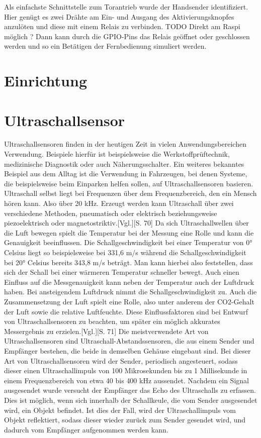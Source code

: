 Als einfachste Schnittstelle zum Torantrieb wurde der Handsender identifiziert. Hier genügt es zwei Drähte am Ein- und Ausgang des Aktivierungsknopfes anzulöten und diese mit einem Relais zu verbinden. TODO Direkt am Raspi möglich ? Dann kann durch die \ac{GPIO}-Pins das Relais geöffnet oder geschlossen werden und so ein Betätigen der Fernbedienung simuliert werden.

\section{Einrichtung}


\section{Ultraschallsensor}
Ultraschallsensoren finden in der heutigen Zeit in vielen Anwendungsbereichen Verwendung. Beispiele hierfür ist beispielsweise die Werkstoffprüftechnik, medizinische Diagnostik oder auch Näherungsschalter. Ein weiteres bekanntes Beispiel aus dem Alltag ist die Verwendung in Fahrzeugen, bei denen Systeme, die beispielsweise beim Einparken helfen sollen, auf Ultraschallsensoren basieren.
Ultraschall selbst liegt bei Frequenzen über dem Frequenzbereich, den ein Mensch hören kann. Also über 20 kHz. Erzeugt werden kann Ultraschall über zwei verschiedene Methoden, pneumatisch oder elektrisch beziehungsweise piezoelektrisch oder magnetostriktiv.\autocite{sensoren}[Vgl.][S. 70] Da sich Ultraschallwellen über die Luft bewegen spielt die Temperatur bei der Messung eine Rolle und kann die Genauigkeit beeinflussen. Die Schallgeschwindigkeit bei einer Temperatur von 0° Celsius liegt so beispielsweise bei 331,6 m/s während die Schallgeschwindigkeit bei 20° Celsius bereits 343,8 m/s beträgt. Man kann hierbei also feststellen, dass sich der Schall bei einer wärmeren Temperatur schneller bewegt. 
Auch einen Einfluss auf die Messgenauigkeit kann neben der Temperatur auch der Luftdruck haben. Bei ansteigendem Luftdruck nimmt die Schallgeschwindigkeit zu. Auch die Zusammensetzung der Luft spielt eine Rolle, also unter anderem der CO2-Gehalt der Luft sowie die relative Luftfeuchte. Diese Einflussfaktoren sind bei Entwurf von Ultraschallsensoren zu beachten, um später ein möglich akkurates Messergebnis zu erzielen.\autocite{sensoren}[Vgl.][S. 71]
Die meistverwendete Art von Ultraschallsensoren sind Ultraschall-Abstandssensoren, die aus einem Sender und Empfänger bestehen, die beide in demselben Gehäuse eingebaut sind. Bei dieser Art von Ultraschallsensoren wird der Sender, periodisch angesteuert, sodass dieser einen Ultraschallimpuls von 100 Mikrosekunden bis zu 1 Millisekunde in einem Frequenzbereich von etwa 40 bis 400 kHz aussendet. Nachdem ein Signal ausgesendet wurde versucht der Empfänger das Echo des Ultraschalls zu erfassen. Dies ist möglich, wenn sich innerhalb der Schallkeule, die vom Sender ausgesendet wird, ein Objekt befindet. Ist dies der Fall, wird der Ultraschallimpuls vom Objekt reflektiert, sodass dieser wieder zurück zum Sender gesendet wird, und dadurch vom Empfänger aufgenommen werden kann.

